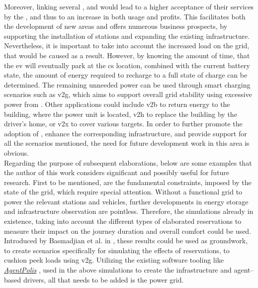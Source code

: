 Moreover, linking several ,  and  would lead to a higher acceptance of their services by the , and thus to an increase in both usage and profits.
This facilitates both the development of new areas and offers numerous business prospects, by supporting the installation of stations and expanding the existing infrastructure.
Nevertheless, it is important to take into account the increased load on the grid, that would be caused as a result. 
However, by knowing the amount of time, that the \acrshort{ev} will eventually park at the \acrshort{cs} location, combined with the current battery state, the amount of energy required to recharge to a full state of charge can be determined.
The remaining unneeded power can be used through smart charging scenarios such as \acrshort{v2g}, which aims to support overall grid stability using excessive power from .
Other applications could include \acrshort{v2b} to return energy to the building, where the power unit is located, \acrshort{v2h} to replace the building by the driver's home, or \acrshort{v2x} to cover various targets.
In order to further promote the adoption of , enhance the corresponding infrastructure, and provide support for all the scenarios mentioned, the need for future development work in this area is obvious. \\
\noindent Regarding the purpose of subsequent elaborations, below are some examples that the author of this work considers significant and possibly useful for future research. 
First to be mentioned, are the fundamental constraints, imposed by the state of the grid, which require special attention. 
Without a functional grid to power the relevant stations and vehicles, further developments in energy storage and infrastructure observation are pointless.
Therefore, the simulations already in existence, taking into account the different types of elaborated reservations to measure their impact on the journey duration and overall comfort could be used.
Introduced by Basmadjian et al. in \cite{basmadjian_reference_2020,basmadjian_interoperable_2019}, these results could be used as groundwork, to create scenarios specifically for simulating the effects of reservations, to cushion peek loads using \acrshort{v2g}.
Utilizing the existing software tooling like \href{https://github.com/aicenter/agentpolis}{\textit{AgentPolis}} \cite{noauthor_agentpolis_2022}, used in the above simulations to create the infrastructure and agent--based drivers, all that needs to be added is the power grid.
